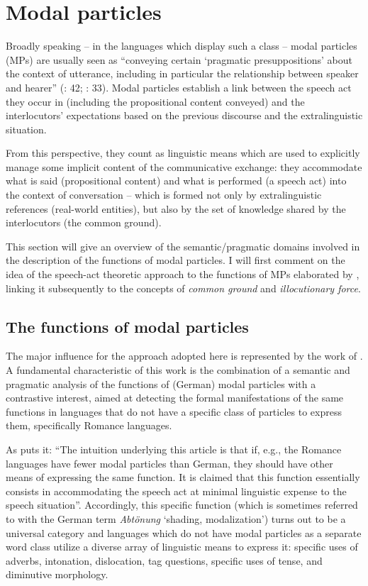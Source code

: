 \section{Modal particles}
\hypertarget{Toc124860619}{}
Broadly speaking – in the languages which display such a class – modal particles (MPs) are usually seen as “conveying certain ‘pragmatic presuppositions’ about the context of utterance, including in particular the relationship between speaker and hearer” (\citealt{Hansen1998a}: 42; \citealt{Diewald2013}: 33). Modal particles establish a link between the speech act they occur in (including the propositional content conveyed) and the interlocutors’ expectations based on the previous discourse and the extralinguistic situation.

From this perspective, they count as linguistic means which are used to explicitly manage some implicit content of the communicative exchange: they accommodate what is said (propositional content) and what is performed (a speech act) into the context of conversation – which is formed not only by extralinguistic references (real-world entities), but also by the set of knowledge shared by the interlocutors (the common ground).

\hspace*{-.9pt}This section will give an overview of the semantic/pragmatic domains involved in the description of the functions of modal particles. I will first comment on the idea of the speech-act theoretic approach to the functions of MPs elaborated by \citet{Waltereit2001,Waltereit2006}, linking it subsequently to the concepts of \textit{common ground} and \textit{illocutionary force}.

\subsection{The functions of modal particles}
\hypertarget{Toc124860620}{}
The major influence for the approach adopted here is represented by the work of \citet{Waltereit2001,Waltereit2006}. A fundamental characteristic of this work is the combination of a semantic and pragmatic analysis of the functions of (German) modal particles with a contrastive interest, aimed at detecting the formal manifestations of the same functions in languages that do not have a specific class of particles to express them, specifically Romance languages.

As \citet[1391]{Waltereit2001} puts it: “The intuition underlying this article is that if, e.g., the Romance languages have fewer modal particles than German, they should have other means of expressing the same function. It is claimed that this function essentially consists in accommodating the speech act at minimal linguistic expense to the speech situation”. Accordingly, this specific function (which is sometimes referred to with the German term \textit{Abtönung} ‘shading, modalization’) turns out to be a universal category and languages which do not have modal particles as a separate word class utilize a diverse array of linguistic means to express it: specific uses of adverbs, intonation, dislocation, tag questions, specific uses of tense, and diminutive morphology.


